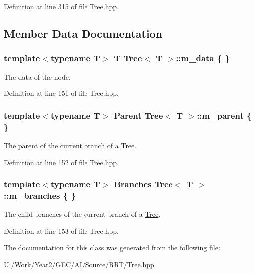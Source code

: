 Definition at line 315 of file Tree.\+hpp.



\subsection{Member Data Documentation}
\hypertarget{classTree_a4ace53b9a58c7c6a96b85be871471f62}{
\subsubsection[{m\+\_\+data}]{\setlength{\rightskip}{0pt plus 5cm}template$<$typename T$>$ T {\bf Tree}$<$ T $>$\+::m\+\_\+data \{ \}\hspace{0.3cm}{\ttfamily [private]}}}\label{classTree_a4ace53b9a58c7c6a96b85be871471f62}


The data of the node. 



Definition at line 151 of file Tree.\+hpp.

\hypertarget{classTree_ac742fce39cb2288663f891d77c3e4748}{
\subsubsection[{m\+\_\+parent}]{\setlength{\rightskip}{0pt plus 5cm}template$<$typename T$>$ {\bf Parent} {\bf Tree}$<$ T $>$\+::m\+\_\+parent \{ \}\hspace{0.3cm}{\ttfamily [private]}}}\label{classTree_ac742fce39cb2288663f891d77c3e4748}


The parent of the current branch of a \hyperlink{classTree}{Tree}. 



Definition at line 152 of file Tree.\+hpp.

\hypertarget{classTree_ab9520d0aea2873cd23caa31f6d6aa823}{
\subsubsection[{m\+\_\+branches}]{\setlength{\rightskip}{0pt plus 5cm}template$<$typename T$>$ {\bf Branches} {\bf Tree}$<$ T $>$\+::m\+\_\+branches \{ \}\hspace{0.3cm}{\ttfamily [private]}}}\label{classTree_ab9520d0aea2873cd23caa31f6d6aa823}


The child branches of the current branch of a \hyperlink{classTree}{Tree}. 



Definition at line 153 of file Tree.\+hpp.



The documentation for this class was generated from the following file\+:\begin{DoxyCompactItemize}
\item 
U\+:/\+Work/\+Year2/\+G\+E\+C/\+A\+I/\+Source/\+R\+R\+T/\hyperlink{Tree_8hpp}{Tree.\+hpp}\end{DoxyCompactItemize}
